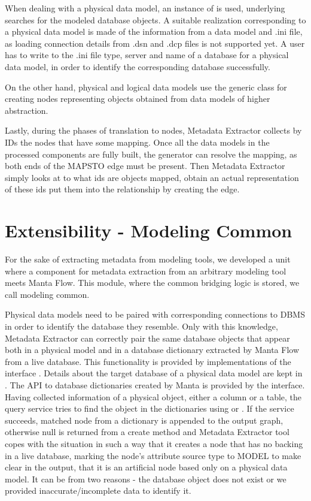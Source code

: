 When dealing with a physical data model, an instance of  is used, underlying  searches for the modeled database objects. 
A suitable  realization corresponding to a physical data model is made of the information from a data model and .ini file, as loading connection details from .dsn and .dcp files is not supported yet. A user has to write to the .ini file type, server and name of a database for a physical data model, in order to identify the corresponding database successfully.

On the other hand, physical and logical data models use the generic  class for creating nodes representing objects obtained from data models of higher abstraction.

Lastly, during the phases of translation to nodes, Metadata Extractor collects by IDs the nodes that have some mapping.
Once all the data models in the processed components are fully built, the generator can resolve the mapping, as both ends of the MAPS\textunderscore TO edge must be present. 
Then Metadata Extractor simply looks at to what ids are objects mapped, obtain an actual representation of these ids put them into the relationship by creating the edge.

\section{Extensibility - Modeling Common}
\label{modeling_common}

For the sake of extracting metadata from modeling tools, we developed a unit where a component for metadata extraction from an arbitrary modeling tool meets Manta Flow.
This module, where the common bridging logic is stored, we call modeling common.

Physical data models need to be paired with corresponding connections to DBMS in order to identify the database they resemble. 
Only with this knowledge, Metadata Extractor can correctly pair the same database objects that appear both in a physical model and in a database dictionary extracted by Manta Flow from a live database. 
This functionality is provided by implementations of the interface . Details about the target database of a physical data model are kept in . 
The API to database dictionaries created by Manta is provided by the  interface. 
Having collected information of a physical object, either a column or a table, the query service tries to find the object in the dictionaries using  or . 
If the service succeeds, matched node from a dictionary is appended to the output graph, otherwise null is returned from a create method and Metadata Extractor tool copes with the situation in such a way that it creates a node that has no backing in a live database, marking the node's attribute source type to MODEL to make clear in the output, that it is an artificial node based only on a physical data model. 
It can be from two reasons - the database object does not exist or we provided inaccurate/incomplete data to identify it.

